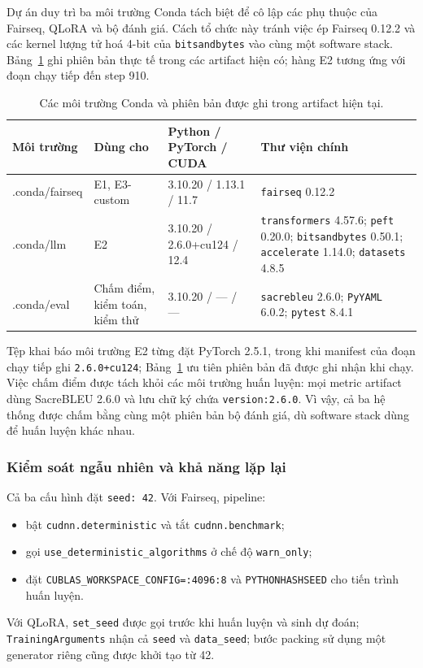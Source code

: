 Dự án duy trì ba môi trường Conda tách biệt để cô lập các phụ thuộc của
Fairseq, QLoRA và bộ đánh giá. Cách tổ chức này tránh việc ép Fairseq 0.12.2 và
các kernel lượng tử hoá 4-bit của \texttt{bitsandbytes} vào cùng một software
stack. Bảng~\ref{tab:compute-env} ghi phiên bản thực tế trong các artifact hiện
có; hàng E2 tương ứng với đoạn chạy tiếp đến step 910.

\begin{table}[tbp]
  \centering
  \small
  \renewcommand{\arraystretch}{1.18}
  \caption{Các môi trường Conda và phiên bản được ghi trong artifact hiện tại.}
  \label{tab:compute-env}
  \begin{tabularx}{\textwidth}{@{}>{\ttfamily}p{2.3cm}p{2.3cm}p{3.15cm}X@{}}
    \toprule
    \normalfont\textbf{Môi trường} & \textbf{Dùng cho}
      & \textbf{Python / PyTorch / CUDA} & \textbf{Thư viện chính} \\
    \midrule
    .conda/\allowbreak fairseq
      & E1, E3-custom
      & 3.10.20 / 1.13.1 / 11.7
      & \texttt{fairseq} 0.12.2 \\
    .conda/llm
      & E2
      & 3.10.20 / 2.6.0+cu124 / 12.4
      & \texttt{transformers} 4.57.6; \texttt{peft} 0.20.0;
        \texttt{bitsandbytes} 0.50.1; \texttt{accelerate} 1.14.0;
        \texttt{datasets} 4.8.5 \\
    .conda/eval
      & Chấm điểm, kiểm toán, kiểm thử
      & 3.10.20 / --- / ---
      & \texttt{sacrebleu} 2.6.0; \texttt{PyYAML} 6.0.2;
        \texttt{pytest} 8.4.1 \\
    \bottomrule
  \end{tabularx}
\end{table}

Tệp khai báo môi trường E2 từng đặt PyTorch 2.5.1, trong khi manifest của đoạn
chạy tiếp ghi \texttt{2.6.0+cu124}; Bảng~\ref{tab:compute-env} ưu tiên phiên bản
đã được ghi nhận khi chạy. Việc chấm điểm được tách khỏi các môi trường huấn
luyện: mọi metric artifact dùng SacreBLEU 2.6.0 và lưu chữ ký chứa
\texttt{version:2.6.0}. Vì vậy, cả ba hệ thống được chấm bằng cùng một phiên bản
bộ đánh giá, dù software stack dùng để huấn luyện khác nhau.

\subsubsection{Kiểm soát ngẫu nhiên và khả năng lặp lại}

Cả ba cấu hình đặt \texttt{seed: 42}. Với Fairseq, pipeline:
\begin{itemize}
  \item bật \texttt{cudnn.deterministic} và tắt
  \texttt{cudnn.benchmark};
  \item gọi \texttt{use\_deterministic\_algorithms} ở chế độ
  \texttt{warn\_only};
  \item đặt \texttt{CUBLAS\_WORKSPACE\_CONFIG=:4096:8} và
  \texttt{PYTHONHASHSEED} cho tiến trình huấn luyện.
\end{itemize}
Với QLoRA, \texttt{set\_seed} được gọi trước khi huấn luyện và sinh dự đoán;
\texttt{TrainingArguments} nhận cả \texttt{seed} và \texttt{data\_seed}; bước
packing sử dụng một generator riêng cũng được khởi tạo từ 42.

